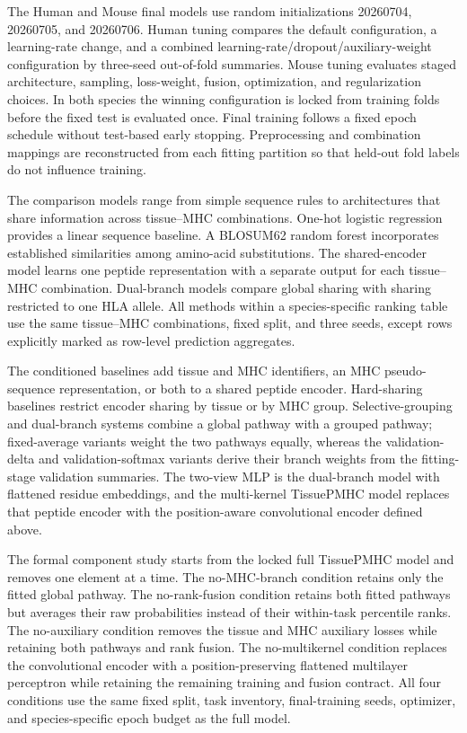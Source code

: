 The Human and Mouse final models use random initializations 20260704, 20260705, and 20260706. Human tuning compares the default configuration, a learning-rate change, and a combined learning-rate/dropout/auxiliary-weight configuration by three-seed out-of-fold summaries. Mouse tuning evaluates staged architecture, sampling, loss-weight, fusion, optimization, and regularization choices. In both species the winning configuration is locked from training folds before the fixed test is evaluated once. Final training follows a fixed epoch schedule without test-based early stopping. Preprocessing and combination mappings are reconstructed from each fitting partition so that held-out fold labels do not influence training.

The comparison models range from simple sequence rules to architectures that share information across tissue--MHC combinations. One-hot logistic regression provides a linear sequence baseline. A BLOSUM62 random forest incorporates established similarities among amino-acid substitutions. The shared-encoder model learns one peptide representation with a separate output for each tissue--MHC combination. Dual-branch models compare global sharing with sharing restricted to one HLA allele. All methods within a species-specific ranking table use the same tissue--MHC combinations, fixed split, and three seeds, except rows explicitly marked as row-level prediction aggregates.

The conditioned baselines add tissue and MHC identifiers, an MHC pseudo-sequence representation, or both to a shared peptide encoder. Hard-sharing baselines restrict encoder sharing by tissue or by MHC group. Selective-grouping and dual-branch systems combine a global pathway with a grouped pathway; fixed-average variants weight the two pathways equally, whereas the validation-delta and validation-softmax variants derive their branch weights from the fitting-stage validation summaries. The two-view MLP is the dual-branch model with flattened residue embeddings, and the multi-kernel TissuePMHC model replaces that peptide encoder with the position-aware convolutional encoder defined above.

The formal component study starts from the locked full TissuePMHC model and removes one element at a time. The no-MHC-branch condition retains only the fitted global pathway. The no-rank-fusion condition retains both fitted pathways but averages their raw probabilities instead of their within-task percentile ranks. The no-auxiliary condition removes the tissue and MHC auxiliary losses while retaining both pathways and rank fusion. The no-multikernel condition replaces the convolutional encoder with a position-preserving flattened multilayer perceptron while retaining the remaining training and fusion contract. All four conditions use the same fixed split, task inventory, final-training seeds, optimizer, and species-specific epoch budget as the full model.

